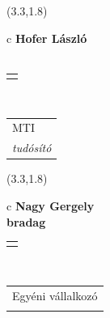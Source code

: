 \documentclass[11pt]{article}
\begin{document}
\makebox(3.3,1.8){
  \renewcommand\arraystretch{1.3}
  \begin{tabular}[c]{c}
    \hspace{8.5mm}
    \LARGE\bf{ Hofer László }\\
    \hspace{8.5mm}
    \Large{  }\\
    \renewcommand\arraystretch{3}
    \begin{tabular}[c]{c}
      \centering
      \fontfamily{phv}\selectfont{
        \textbf{
          \textsc{
            \scriptsize{
            \color{Dark}{ Ismerkedő }\color{Bright}{ Webmester }\color{Bright}{ Sminkmester }\color{Bright}{ Programozó }
            }
          }
        }
      }
    \end{tabular}
    \\
    \renewcommand\arraystretch{1}
    \begin{tabular}{p{3.3in}}
      \hspace{.7cm}MTI\\
      \hspace{.7cm}\emph{ tudósító }\\
    \end{tabular}
  \end{tabular}
}

\makebox(3.3,1.8){
  \renewcommand\arraystretch{1.3}
  \begin{tabular}[c]{c}
    \hspace{8.5mm}
    \LARGE\bf{ Nagy Gergely }\\
    \hspace{8.5mm}
    \Large{ bradag }\\
    \renewcommand\arraystretch{3}
    \begin{tabular}[c]{c}
      \centering
      \fontfamily{phv}\selectfont{
        \textbf{
          \textsc{
            \scriptsize{
            \color{Dark}{ Ismerkedő }\color{Dark}{ Webmester }\color{Bright}{ Sminkmester }\color{Bright}{ Programozó }
            }
          }
        }
      }
    \end{tabular}
    \\
    \renewcommand\arraystretch{1}
    \begin{tabular}{p{3.3in}}
      \hspace{.7cm}Egyéni vállalkozó\\
      \hspace{.7cm}\emph{  }\\
    \end{tabular}
  \end{tabular}
}
\end{document}
